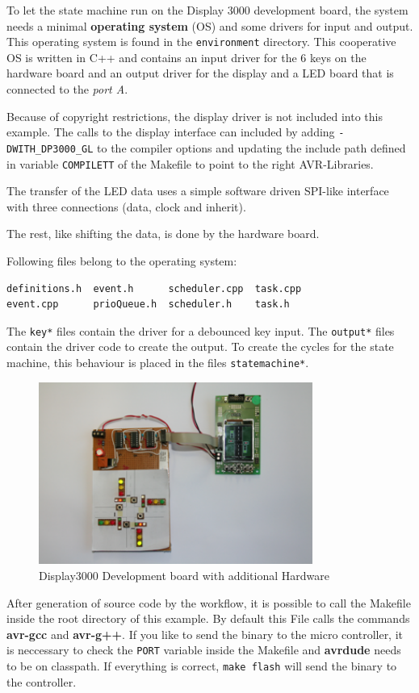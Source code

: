 To let the state machine run on the Display 3000 development board, the system
needs a minimal \textbf{operating system} (OS) and some drivers for input and
output. This operating system is found in the \texttt{environment} directory.
This cooperative OS is written in C++ and contains an input driver for the 6 keys
on the hardware board and an output driver for the display and a LED board that
is connected to the \textit{port A}.

Because of copyright restrictions, the display driver is not included into this
example. The calls to the display interface can included by adding
\texttt{-DWITH\_DP3000\_GL} to the compiler options and updating the include
path defined in variable \texttt{COMPILETT} of the Makefile to point to the
right AVR-Libraries.

The transfer of the LED data uses a simple software driven SPI-like interface
with three connections (data, clock and inherit).

The rest, like shifting the data, is done by the hardware board.

Following files belong to the operating system:
\begin{verbatim}
definitions.h  event.h      scheduler.cpp  task.cpp
event.cpp      prioQueue.h  scheduler.h    task.h
\end{verbatim}

The \texttt{key*} files contain the driver for a debounced key input. The
\texttt{output*} files contain the driver code to create the output. To create
the cycles for the state machine, this behaviour is placed in the files
\texttt{statemachine*}.

\begin{figure}[h!]
\center
\includegraphics[width=0.8\textwidth]{./Pictures/Board1}
\caption{\label{fig:board1}Display3000 Development board with additional Hardware}
\end{figure}

After generation of source code by the workflow, it is possible to call the
Makefile inside the root directory of this example. By default this File calls
the commands \textbf{avr-gcc} and \textbf{avr-g++}. If you like to send
the binary to the micro controller, it is neccessary to check the \texttt{PORT}
variable inside the Makefile and \textbf{avrdude} needs to be on classpath. If
everything is correct, \texttt{make flash} will send the binary to the controller.
\newpage

